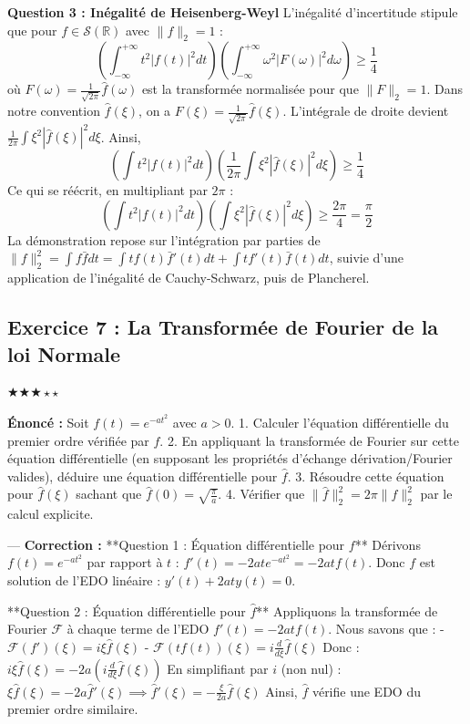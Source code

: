 \documentclass[11pt,a4paper]{article}
\begin{document}
\textbf{Question 3 : Inégalité de Heisenberg-Weyl}
L'inégalité d'incertitude stipule que pour $f \in \mathcal{S}(\mathbb{R})$ avec $\|f\|_2 = 1$ :
$$ \left( \int_{-\infty}^{+\infty} t^2 |f(t)|^2 dt \right) \left( \int_{-\infty}^{+\infty} \omega^2 |F(\omega)|^2 d\omega \right) \ge \frac{1}{4} $$
où $F(\omega) = \frac{1}{\sqrt{2\pi}} \hat{f}(\omega)$ est la transformée normalisée pour que $\|F\|_2 = 1$.
Dans notre convention $\hat{f}(\xi)$, on a $F(\xi) = \frac{1}{\sqrt{2\pi}} \hat{f}(\xi)$. L'intégrale de droite devient $\frac{1}{2\pi} \int \xi^2 |\hat{f}(\xi)|^2 d\xi$.
Ainsi,
$$ \left( \int t^2 |f(t)|^2 dt \right) \left( \frac{1}{2\pi} \int \xi^2 |\hat{f}(\xi)|^2 d\xi \right) \ge \frac{1}{4} $$
Ce qui se réécrit, en multipliant par $2\pi$ :
$$ \left( \int t^2 |f(t)|^2 dt \right) \left( \int \xi^2 |\hat{f}(\xi)|^2 d\xi \right) \ge \frac{2\pi}{4} = \frac{\pi}{2} $$
La démonstration repose sur l'intégration par parties de $\|f\|_2^2 = \int f \bar{f} dt = \int t f(t) \bar{f}'(t) dt + \int t f'(t) \bar{f}(t) dt$, suivie d'une application de l'inégalité de Cauchy-Schwarz, puis de Plancherel.


\subsection*{Exercice 7 : La Transformée de Fourier de la loi Normale}
$\bigstar\bigstar\bigstar\star\star$

\textbf{Énoncé :}
Soit $f(t) = e^{-at^2}$ avec $a > 0$.
1. Calculer l'équation différentielle du premier ordre vérifiée par $f$.
2. En appliquant la transformée de Fourier sur cette équation différentielle (en supposant les propriétés d'échange dérivation/Fourier valides), déduire une équation différentielle pour $\hat{f}$.
3. Résoudre cette équation pour $\hat{f}(\xi)$ sachant que $\hat{f}(0) = \sqrt{\frac{\pi}{a}}$.
4. Vérifier que $\|\hat{f}\|_2^2 = 2\pi \|f\|_2^2$ par le calcul explicite.

---
\textbf{Correction :}
**Question 1 : Équation différentielle pour $f$**
Dérivons $f(t) = e^{-at^2}$ par rapport à $t$ :
$f'(t) = -2at e^{-at^2} = -2at f(t)$.
Donc $f$ est solution de l'EDO linéaire : $y'(t) + 2at y(t) = 0$.

**Question 2 : Équation différentielle pour $\hat{f}$**
Appliquons la transformée de Fourier $\mathcal{F}$ à chaque terme de l'EDO $f'(t) = -2at f(t)$.
Nous savons que :
- $\mathcal{F}(f')(\xi) = i\xi \hat{f}(\xi)$
- $\mathcal{F}(tf(t))(\xi) = i \frac{d}{d\xi} \hat{f}(\xi)$
Donc :
$i\xi \hat{f}(\xi) = -2a \left( i \frac{d}{d\xi} \hat{f}(\xi) \right)$
En simplifiant par $i$ (non nul) :
$\xi \hat{f}(\xi) = -2a \hat{f}'(\xi) \implies \hat{f}'(\xi) = -\frac{\xi}{2a} \hat{f}(\xi)$
Ainsi, $\hat{f}$ vérifie une EDO du premier ordre similaire.
\end{document}
